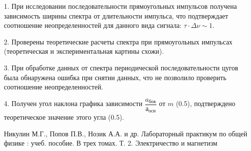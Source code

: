 \documentclass[a4paper,12pt]{article} %
\begin{document}
1. При исследовании последовательности прямоугольных импульсов получена зависимость ширины спектра от длительности импульса, что подтверждает соотношение неопределенностей для данного вида сигнала: $\tau \cdot \Delta\nu \sim 1$.

2. Проверены теоретические расчеты спектра при прямоугольных импульсах (теоретическая и экспериментальная картины схожи).

3. При обработке данных от спектра периодической последовательности цугов была обнаружена ошибка при снятии данных, что не позволило проверить соотношение неопределенностей.

4. Получен угол наклона графика зависимости $\dfrac{a_{бок}}{а_{осн}}$ от $m$ (0.5), подтверждено теоретическое значение этого угла (0.5).


\begin{thebibliography}{}
      Никулин М.Г., Попов П.В., Нозик А.А. и др. Лабораторный практикум по общей физике : учеб. пособие. В трех томах. Т. 2. Электричество и магнетизм
\end{thebibliography}
\end{document}
